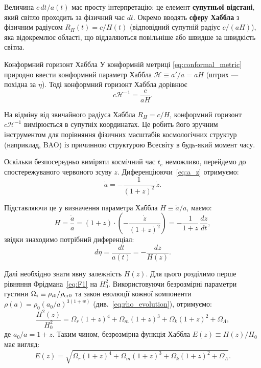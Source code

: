 Величина $c\,dt/a(t)$ має просту інтерпретацію: це елемент
\textbf{супутньої відстані}, який світло проходить за фізичний час $dt$.
Окремо вводять \textbf{сферу Хаббла} з фізичним радіусом
$R_H(t) = c/H(t)$ (відповідний супутній радіус $c/(aH)$), яка відокремлює області, що віддаляються повільніше або швидше
за швидкість світла.


\begin{keybox}{Конформний горизонт Хаббла}
У конформній метриці \eqref{eq:conformal_metric} природно ввести
конформний параметр Хаббла $\mathcal{H} \equiv a'/a = aH$ (штрих ---
похідна за $\eta$). Тоді конформний горизонт Хаббла дорівнює
\begin{equation*}
    c\mathcal{H}^{-1} = \frac{c}{aH}.
\end{equation*}

На відміну від звичайного радіуса Хаббла $R_H = c/H$, конформний горизонт $c\mathcal{H}^{-1}$ вимірюється в супутніх координатах. Це робить його зручним інструментом для порівняння фізичних масштабів космологічних структур (наприклад, BAO) із причинною структурою Всесвіту в будь-який момент часу.
\end{keybox}


Оскільки безпосередньо виміряти космічний час $t_e$ неможливо,
перейдемо до спостережуваного червоного зсуву $z$. Диференціюючи~\eqref{eq:a_z} отримуємо:
\begin{equation*}
\dot{a} = -\frac{1}{(1+z)^2}\,\dot{z}.
\end{equation*}

Підставляючи це у визначення параметра Хаббла $H \equiv \dot{a}/a$, маємо:
\begin{equation*}
    H = \frac{\dot{a}}{a} = (1+z) \cdot \left( -\frac{\dot{z}}{(1+z)^2} \right)
    = -\frac{1}{1+z}\,\frac{dz}{dt},
\end{equation*}
звідки знаходимо потрібний диференціал:
\begin{equation*}
d\eta = \frac{dt}{a(t)} = -\frac{dz}{H(z)}.
\end{equation*}

Далі необхідно знати явну залежність $H(z)$. Для цього розділимо
перше рівняння Фрідмана~\eqref{eq:F1} на $H_0^2$. Використовуючи безрозмірні параметри густини
$\Omega_i \equiv \rho_{i0}/\rho_{\rm cr0}$ та закон еволюції кожної
компоненти $\rho(a) = \rho_0 (a_0/a)^{3(1+w)}$ (див.~\eqref{eq:rho_evolution}),
отримуємо:
\begin{equation*}
    \frac{H^2(z)}{H_0^2} = \Omega_r(1+z)^4 + \Omega_m(1+z)^3 + \Omega_k(1+z)^2 +  \Omega_\Lambda,
\end{equation*}
де $a_0/a = 1+z$. Таким чином, безрозмірна функція Хаббла
$E(z) \equiv H(z)/H_0$ має вигляд:
\begin{equation}\label{eq:Ez}
E(z) = \sqrt{\Omega_r(1+z)^4 + \Omega_m(1+z)^3 + \Omega_k(1+z)^2 + \Omega_\Lambda}.
\end{equation}

